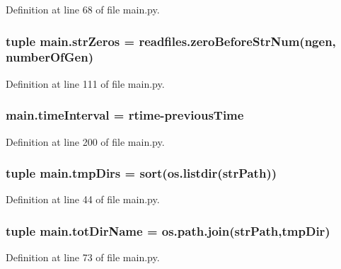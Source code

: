 Definition at line 68 of file main.\-py.

\hypertarget{a00117_a02d59015bebcf0ad1bc1162efca757c3}{
\subsubsection[{str\-Zeros}]{\setlength{\rightskip}{0pt plus 5cm}tuple main.\-str\-Zeros = readfiles.\-zero\-Before\-Str\-Num(ngen, {\bf number\-Of\-Gen})}}\label{a00117_a02d59015bebcf0ad1bc1162efca757c3}


Definition at line 111 of file main.\-py.

\hypertarget{a00117_a5ba0cd0b7538ed8047b2fea322ecb4b7}{
\subsubsection[{time\-Interval}]{\setlength{\rightskip}{0pt plus 5cm}main.\-time\-Interval = {\bf rtime}-\/{\bf previous\-Time}}}\label{a00117_a5ba0cd0b7538ed8047b2fea322ecb4b7}


Definition at line 200 of file main.\-py.

\hypertarget{a00117_a9606754176252315321d1faa6191479e}{
\subsubsection[{tmp\-Dirs}]{\setlength{\rightskip}{0pt plus 5cm}tuple main.\-tmp\-Dirs = sort(os.\-listdir({\bf str\-Path}))}}\label{a00117_a9606754176252315321d1faa6191479e}


Definition at line 44 of file main.\-py.

\hypertarget{a00117_a82f73a786e4c93e909fd689ee0d0812e}{
\subsubsection[{tot\-Dir\-Name}]{\setlength{\rightskip}{0pt plus 5cm}tuple main.\-tot\-Dir\-Name = os.\-path.\-join({\bf str\-Path},tmp\-Dir)}}\label{a00117_a82f73a786e4c93e909fd689ee0d0812e}


Definition at line 73 of file main.\-py.

